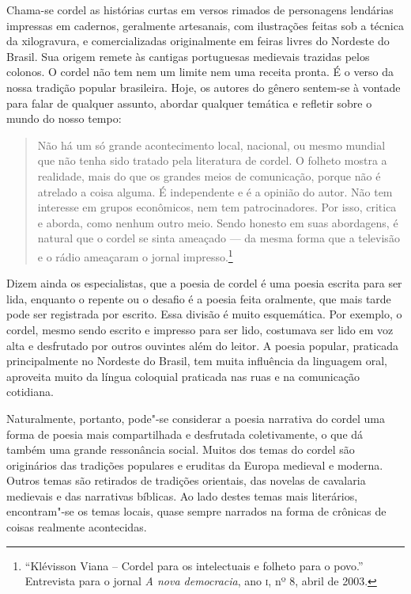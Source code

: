 \documentclass[11pt]{extarticle}
\begin{document}
Chama-se cordel as histórias curtas em versos rimados de personagens lendárias impressas em cadernos, geralmente artesanais, com ilustrações feitas sob a técnica da 
xilogravura, e comercializadas originalmente em feiras livres do Nordeste do Brasil. 
Sua origem remete às cantigas portuguesas medievais trazidas pelos colonos.
O cordel não tem nem um limite nem uma receita pronta. É o verso da 
nossa tradição popular brasileira. Hoje, os autores do gênero sentem-se à vontade para falar de qualquer 
assunto, abordar qualquer temática e refletir sobre o mundo do nosso tempo:

\begin{quote}
Não há um só grande acontecimento local, nacional, ou mesmo mundial que não tenha sido tratado pela literatura de cordel. O folheto mostra a realidade, mais do que os grandes meios de comunicação, porque não é atrelado a coisa alguma. É independente e é a opinião do autor. Não tem interesse em grupos econômicos, nem tem patrocinadores. Por isso, critica e aborda, como nenhum outro meio. 
Sendo honesto em suas abordagens, é natural que o cordel se sinta ameaçado --- da mesma forma que  a televisão e o rádio ameaçaram o jornal impresso.\footnote{``Klévisson Viana -- Cordel para os intelectuais e folheto para o povo.'' Entrevista para o jornal \textit{A nova democracia}, ano \textsc{i}, nº 8, abril de 2003.}
\end{quote}

Dizem ainda os especialistas, que a poesia de cordel é uma poesia escrita para
ser lida, enquanto o repente ou o desafio é a poesia feita oralmente, que mais tarde pode
ser registrada por escrito. Essa divisão é muito esquemática. Por exemplo, o
cordel, mesmo sendo escrito e impresso para ser lido, costumava ser lido em
voz alta e desfrutado por outros ouvintes além do leitor. A poesia popular,
praticada principalmente no Nordeste do Brasil, tem muita influência da
linguagem oral, aproveita muito da língua coloquial praticada nas ruas e na
comunicação cotidiana. 

Naturalmente, portanto, pode"-se considerar a poesia narrativa do cordel uma
forma de poesia mais compartilhada e desfrutada coletivamente, o que dá também
uma grande ressonância social. Muitos dos temas do cordel são originários das
tradições populares e eruditas da Europa medieval e moderna. Outros temas são
retirados de tradições orientais, das novelas de cavalaria medievais e das narrativas
bíblicas. Ao lado destes temas mais literários, encontram"-se os temas locais,
quase sempre narrados na forma de crônicas de coisas realmente acontecidas.
\end{document}
